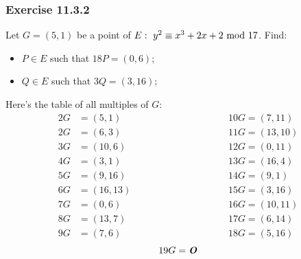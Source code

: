 \subsubsection{Exercise 11.3.2}
Let $G=(5,1)$ be a point of $E:\ y^2\equiv x^3+2x+2\text{ mod }17$. Find:
\begin{itemize}
    \item $P\in E$ such that $18P=(0,6)$;
    \item $Q\in E$ such that $3Q=(3,16)$;
\end{itemize}
Here's the table of all multiples of $G$:
\begin{alignat*}{2}
    G&=(5,1)\hspace{4cm}&&10G=(7,11)\\
    2G&=(6,3)&&11G=(13,10)\\
    3G&=(10,6)&&12G=(0,11)\\
    4G&=(3,1)&&13G=(16,4)\\
    5G&=(9,16)&&14G=(9,1)\\
    6G&=(16,13)&&15G=(3,16)\\
    7G&=(0,6)&&16G=(10,11)\\
    8G&=(13,7)&&17G=(6,14)\\
    9G&=(7,6)&&18G=(5,16)
\end{alignat*}
$$19G=\text{\textbf{\textit{O}}}$$

